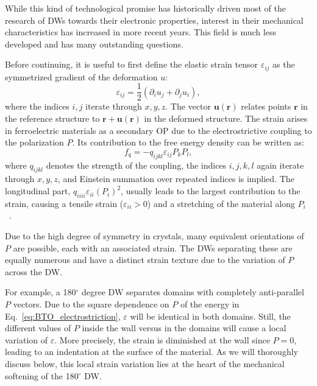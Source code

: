 While this kind of technological promise has historically driven most of the research of \glspl{DW} towards their electronic properties, interest in their mechanical characteristics has increased in more recent years.
This field is much less developed and has many outstanding questions.

Before continuing, it is useful to first define the elastic strain tensor $\varepsilon_{ij}$ as the symmetrized gradient of the deformation $u$:
\begin{equation}
\varepsilon_{ij} = \frac{1}{2}(\partial_i u_j + \partial_j u_i),
\end{equation}
where the indices $i,j$ iterate through $x, y, z$.
The vector $\bm{u}(\bm{r})$ relates points $\bm{r}$ in the reference structure to $\bm{r} + \bm{u}(\bm{r})$ in the deformed structure.
The strain arises in ferroelectric materials as a secondary \gls{OP} due to the electrostrictive coupling to the polarization $P$.
Its contribution to the free energy density can be written as:
\begin{equation}
	\label{eq:BTO_electrostriction}
	f_{q}=-q_{ijkl}\varepsilon_{ij}P_{k}P_{l},
\end{equation}
where $q_{ijkl}$ denotes the strength of the coupling, the indices $i, j, k, l$ again iterate through $x, y, z$, and Einstein summation over repeated indices is implied.
The longitudinal part, $q_{iiii} \varepsilon_{ii} (P_i)^2$, usually leads to the largest contribution to the strain, causing a tensile strain ($\varepsilon_{ii}>0$) and a stretching of the material along $P_i$~\cite{Marton2010}.

Due to the high degree of symmetry in crystals, many equivalent orientations of $P$ are possible, each with an associated strain. The \glspl{DW} separating these are equally numerous and have a distinct strain texture due to the variation of $P$ across the \gls{DW}.

For example, a 180$^\circ$ degree \gls{DW} separates domains with completely anti-parallel $P$ vectors.
Due to the square dependence on $P$ of the energy in Eq.~\eqref{eq:BTO_electrostriction}, $\varepsilon$ will be identical in both domains. Still, the different values of $P$ inside the wall versus in the domains will cause a local variation of $\varepsilon$. More precisely, the strain is diminished at the wall since $P=0$, leading to an indentation at the surface of the material.
As we will thoroughly discuss below, this local strain variation lies at the heart of the mechanical softening of the 180$^\circ$ \gls{DW}.

